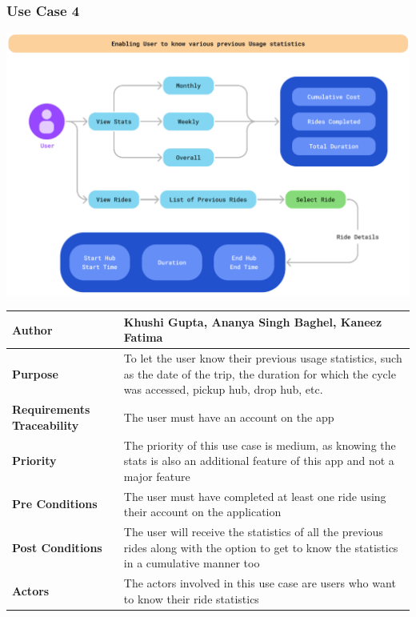 \documentclass[11pt]{article}
\begin{document}
\subsubsection{Use Case 4}
\begin{center}
\includegraphics*[scale=0.5]{usecase-4.png}
\begin{tabular}{|l|p{10cm}|}
    \hline
    \textbf{Author} & Khushi Gupta, Ananya Singh Baghel, Kaneez Fatima\\
    \hline
    \textbf{Purpose} &  To let the user know their previous usage statistics, such as the date of the trip, the duration for which the cycle was accessed, pickup hub, drop hub, etc.\\
    \hline
    \textbf{Requirements Traceability} & The user must have an account on the app\\
    \hline
    \textbf{Priority} &The priority of this use case is medium, as knowing the stats is also an additional feature of this app and not a major feature \\
    \hline
    \textbf{Pre Conditions} & The user must have completed at least one ride using their account on the application\\
    \hline
    \textbf{Post Conditions} & The user will receive the statistics of all the previous rides along with the option to get to know the statistics in a cumulative manner too\\
    \hline
    \textbf{Actors} &The actors involved in this use case are users who want to know their ride statistics \\
    \hline
\end{tabular}
\end{center}
\end{document}
